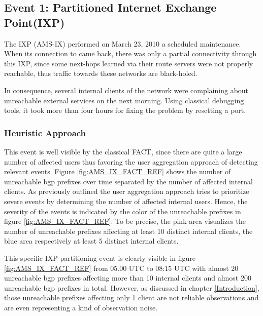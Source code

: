 \subsection{Event 1: Partitioned Internet Exchange Point(IXP)}

The IXP \citet{AMS-IX}(AMS-IX) performed on March 23, 2010 a scheduled  maintenance.
When its connection to \citet{switch} came back, there was only a partial connectivity through this IXP, since some next-hops learned via their route servers were not properly reachable, thus traffic towards these networks are black-holed\citep{SchatzmannPAM2011}.

In consequence, several internal clients of the \citet{switch} network were complaining about unreachable external services on the next morning. 
Using classical debugging tools, it took more than four hours for fixing the problem by resetting a port.\citep{SchatzmannPAM2011}

\subsubsection{Heuristic Approach}
This event is well visible by the classical \gls{FACT}, since there are quite a large number of affected users thus favoring the user aggregation approach of detecting relevant events. 
Figure \ref{fig:AMS_IX_FACT_REF} shows the number of unreachable \gls{bgp} prefixes over time separated by the number of affected internal clients.
As previously outlined the user aggregation approach tries to prioritize severe events by determining the number of affected internal users. 
Hence, the severity of the events is indicated by the color of the unreachable prefixes in figure \ref{fig:AMS_IX_FACT_REF}.
To be precise, the pink area visualizes the number of unreachable prefixes affecting at least 10 distinct internal clients, the blue area respectively at least 5 distinct internal clients.

This specific IXP partitioning event is clearly visible in figure \ref{fig:AMS_IX_FACT_REF} from 05.00 UTC to 08:15 UTC with almost 20 unreachable \gls{bgp} prefixes affecting more than 10 internal clients and almost 200 unreachable \gls{bgp} prefixes in total. 
However, as discussed in chapter \ref{Introduction}, those unreachable prefixes affecting only 1 client are not reliable observations and are even representing a kind of observation noise. 

